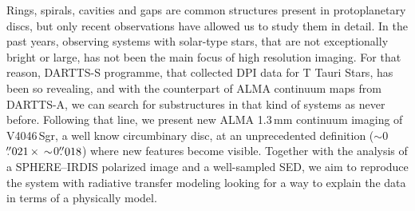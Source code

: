 \documentclass[fleqn,usenatbib,useAMS]{mnras}
\begin{document}
Rings, spirals, cavities and gaps are common structures present in protoplanetary discs, but only recent observations have allowed us to study them in detail. In the past years, observing systems with solar-type stars, that are not exceptionally bright or large, has not been the main focus of high resolution imaging. For that reason, DARTTS-S programme, that collected DPI data for T Tauri Stars, has been so revealing, and with the counterpart of ALMA continuum maps from DARTTS-A, we can search for substructures in that kind of systems as never before. Following that line, we present new ALMA 1.3\,mm continuum imaging of V4046\,Sgr, a well know circumbinary disc, at an unprecedented definition ($\sim$0$\hbox{$.\!\!^{\prime\prime}$}021 \, \times \, \sim$0$\hbox{$.\!\!^{\prime\prime}$}018$) where new features become visible. Together with the analysis of a SPHERE--IRDIS polarized image and a well-sampled SED, we aim to reproduce the system with radiative transfer modeling looking for a way to explain the data in terms of a physically model.
\end{document}
